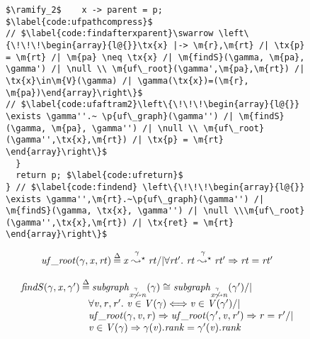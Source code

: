 \begin{figure}[t]
\begin{lstlisting}
$\ramify_2$    x -> parent = p; $\label{code:ufpathcompress}$
// $\label{code:findafterxparent}\swarrow \left\{\!\!\!\begin{array}{l@{}}\tx{x} |-> \m{r},\m{rt} /| \tx{p} = \m{rt} /| \m{pa} \neq \tx{x} /| \m{findS}(\gamma, \m{pa}, \gamma') /| \null \\ \m{uf\_root}(\gamma',\m{pa},\m{rt}) /| \tx{x}\in\m{V}(\gamma) /| \gamma(\tx{x})=(\m{r}, \m{pa})\end{array}\right\}$
// $\label{code:ufaftram2}\left\{\!\!\!\begin{array}{l@{}} \exists \gamma''.~ \p{uf\_graph}(\gamma'') /| \m{findS}(\gamma, \m{pa}, \gamma'') /| \null \\ \m{uf\_root}(\gamma'',\tx{x},\m{rt}) /| \tx{p} = \m{rt} \end{array}\right\}$
  }
  return p; $\label{code:ufreturn}$
} // $\label{code:findend} \left\{\!\!\!\begin{array}{l@{}} \exists \gamma'',\m{rt}.~\p{uf\_graph}(\gamma'') /| \m{findS}(\gamma, \tx{x}, \gamma'') /| \null \\\m{uf\_root}(\gamma'',\tx{x},\m{rt}) /| \tx{ret} = \m{rt}  \end{array}\right\}$
\end{lstlisting}

\begin{equation*}
\begin{array}{l@{\hspace{2pt}}c@{\hspace{2pt}}l}
\m{uf\_root}(\gamma,\m{x},\m{rt}) \defeq \m{x} \mathrel{{\stackrel{\gamma~}{\leadsto^{\star}}}} \m{rt} /| \forall \m{rt'}.~\m{rt} \mathrel{{\stackrel{\gamma~}{\leadsto^{\star}}}} \m{rt'} => \m{rt} = \m{rt'}
\end{array}
\end{equation*}

\begin{equation*}
\begin{array}{l@{\hspace{2pt}}c@{\hspace{2pt}}l}
\m{findS}(\gamma,\m{x},\gamma') \defeq \m{subgraph}_{\m{x} \mathrel{{\stackrel{\gamma~}{\not\leadsto}}} \m{n}}(\gamma) \cong \m{subgraph}_{\m{x} \mathrel{{\stackrel{\gamma~}{\not\leadsto}}} \m{n}}(\gamma') /| \null \\ 
\hspace{68pt} \forall \m{v}, \m{r}, \m{r'}.~ \m{v}\in\m{V}(\gamma) <=> \m{v}\in\m{V}(\gamma') /|  \null \\ 
\hspace{68pt} \m{uf\_root}(\gamma, \m{v}, \m{r}) => \m{uf\_root}(\gamma', \m{v}, \m{r'}) => \m{r} = \m{r'} /| \null \\ 
\hspace{68pt} \m{v}\in\m{V}(\gamma) => \gamma(\m{v}).\m{rank} = \gamma'(\m{v}).\m{rank}
\end{array}
\end{equation*}


\end{figure}
